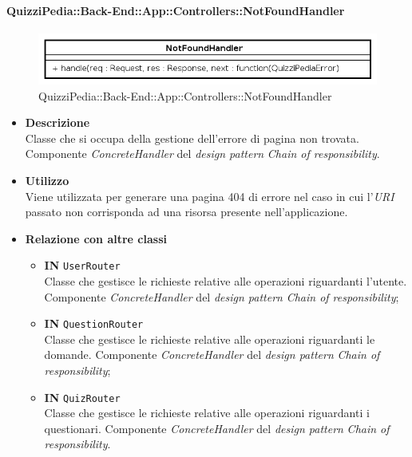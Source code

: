 \paragraph{QuizziPedia::Back-End::App::Controllers::NotFoundHandler}
\label{QuizziPedia::Back-End::App::Controllers::NotFoundHandler}
\begin{figure}[ht]
	\centering
	\includegraphics[scale=0.45]{UML/Package/QuizziPedia_Back-End_App_Controllers_notFoundHandler.png}
	\caption{QuizziPedia::Back-End::App::Controllers::NotFoundHandler}
\end{figure}
\FloatBarrier
\begin{itemize}
	\item \textbf{Descrizione}\\
	Classe che si occupa della gestione dell'errore di pagina non trovata. Componente \textit{ConcreteHandler} del \textit{design pattern} \textit{Chain of responsibility}.
	\item \textbf{Utilizzo}\\
	Viene utilizzata per generare una pagina 404 di errore nel caso in cui l'\textit{URI} passato non corrisponda ad una risorsa presente nell'applicazione.
	\item \textbf{Relazione con altre classi}\\
	\begin{itemize}
		\item \textbf{IN} \texttt{UserRouter}\\
		Classe che gestisce le richieste relative alle operazioni riguardanti l'utente. Componente \textit{ConcreteHandler} del \textit{design pattern} \textit{Chain of responsibility};
		\item \textbf{IN} \texttt{QuestionRouter}\\
		Classe che gestisce le richieste relative alle operazioni riguardanti le domande. Componente \textit{ConcreteHandler} del \textit{design pattern} \textit{Chain of responsibility};
		\item \textbf{IN} \texttt{QuizRouter}\\
		Classe che gestisce le richieste relative alle operazioni riguardanti i questionari. Componente \textit{ConcreteHandler} del \textit{design pattern} \textit{Chain of responsibility}.

\end{itemize}
\end{itemize}
